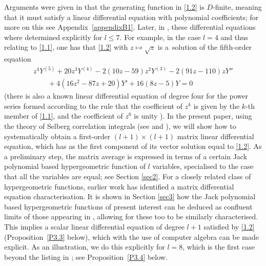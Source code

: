 \documentclass[pdftex]{sigma}
\numberwithin{equation}{section}
\theoremstyle{definition}
\begin{document}
Arguments were given in \cite{Ge90} that the generating function in \eqref{1.2} is $D$-finite, meaning that it must satisfy a linear differential equation with polynomial coefficients;
for more on this see Appendix~\ref{appendixB1}. Later, in \cite{BG00}, these differential equations where determined explicitly for $l \le 7$. For example, in the case $l=4$ and thus relating to \eqref{1.1}, one has that \eqref{1.2} with $z \mapsto \sqrt{z}$ is a~solution of the fifth-order equation \cite[last collection of displayed equations]{BG00}
\begin{gather}
z^4 Y^{(5)} + 20 z^3 Y^{(4)} - 2 (10z - 59) z^2 Y^{(3)} - 2 (91 z -110) z Y'' \nonumber
\\
\qquad + 4 (16z^2 -87 z + 20) Y' + 16 (8z - 5)Y = 0\label{1.5}
\end{gather}
(there is also a known linear differential equation of degree four for the power series formed according to the rule that the coefficient of $z^k$ is given by the $k$-th member of \eqref{1.1}, and the coefficient of $z^0$ is unity \cite[Section~3.3]{B+20}).
In the present paper, using the theory of Selberg correlation integrals (see \cite{Ao87, Da68, FR12} and \cite[Section~4.6]{Fo10}), we will show how to systematically obtain a first-order $(l+1) \times (l+1)$ matrix linear differential equation, which has as the first component of its vector solution equal to
\eqref{1.2}.
As a preliminary step, the matrix average is expressed in terms of a certain Jack polynomial based hypergeometric function of $l$ variables, specialised to the case that all the variables are equal; see Section \ref{sec2}. For a closely related class of hypergeometric functions, earlier work \cite{FK22} has identified a matrix differential equation characterisation. It is shown in Section \ref{sec3} how the Jack polynomial based hypergeometric functions of present interest can be deduced as confluent limits of those appearing in \cite{FK22}, allowing for these too to be
similarly characterised.
This implies a scalar linear differential equation of degree $l+1$ satisfied by \eqref{1.2} (Proposition~\ref{P3.3} below), which with the use of computer algebra can be made explicit. As an illustration, we do this explicitly for $l=8$, which is the first case beyond the listing in \cite{BG00}; see Proposition~\ref{P3.4} below.
\end{document}
